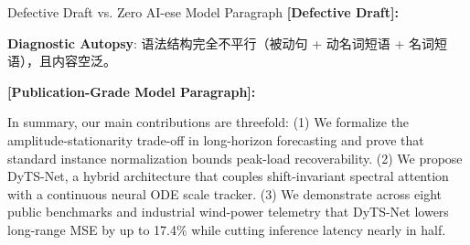 \begin{ExampleBox}{Defective Draft vs. Zero AI-ese Model Paragraph}
\textbf{\color{TargetHighlight}[Defective Draft]:}\par
{}\par\vspace{4pt}
\textbf{Diagnostic Autopsy}: 语法结构完全不平行（被动句 + 动名词短语 + 名词短语），且内容空泛。\par\vspace{6pt}
\textbf{\color{AcadNavy}[Publication-Grade Model Paragraph]:}\par
In summary, our main contributions are threefold: (1) We formalize the amplitude-stationarity trade-off in long-horizon forecasting and prove that standard instance normalization bounds peak-load recoverability. (2) We propose DyTS-Net, a hybrid architecture that couples shift-invariant spectral attention with a continuous neural ODE scale tracker. (3) We demonstrate across eight public benchmarks and industrial wind-power telemetry that DyTS-Net lowers long-range MSE by up to 17.4\% while cutting inference latency nearly in half.
\end{ExampleBox}
